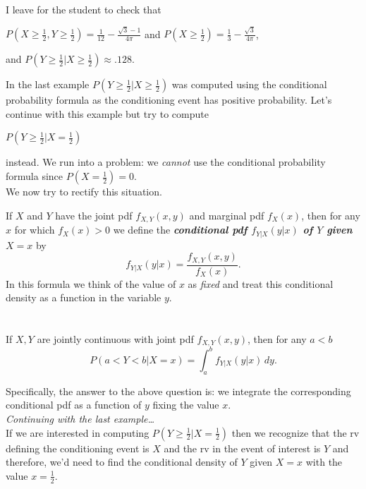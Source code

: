 \documentclass[12pt]{article}
\begin{document}
\noindent I leave for the student to check that
\begin{center}$P(X\ge \frac 12,Y\ge \frac 12) = \frac 1{12} - \frac {\sqrt{3}-1}{4\pi}$ and $P(X\ge \frac 12)=\frac 13-\frac {\sqrt{3}}{4\pi}$,\end{center}
and $P(Y\ge \frac 12|X\ge \frac 12) \approx .128$.\\

\newpage

\noindent In the last example $P(Y\ge \frac 12|X\ge \frac 12)$ was computed using the conditional probability formula as the conditioning event has positive probability.
Let's continue with this example but try to compute
\begin{center}$P(Y\ge \frac 12|X=\frac 12)$\end{center}
instead.  We run into a problem: we {\em cannot} use the conditional probability formula since $P(X=\frac 12)=0$.\\

\noindent We now try to rectify this situation.\\

\label{conditionalpdf}

If $X$ and $Y$ have the joint pdf $f_{X,Y}(x,y)$ and marginal pdf $f_X(x)$, then for any $x$ for which $f_X(x) >0$ we define
the {\bf\em conditional pdf $f_{Y|X}(y|x)$ of $Y$ given $X=x$} by
$$f_{Y|X}(y|x) = \frac {f_{X,Y}(x,y)}{f_X(x)}.$$
In this formula we think of the value of $x$ as {\em fixed} and treat this conditional density as a function in the variable $y$.\\

\\

 \\
If $X,Y$ are jointly continuous with joint pdf $f_{X,Y}(x,y)$, then for any $a<b$
$$P(a< Y< b|X=x) = \int_a^b f_{Y|X}(y|x)\,dy.$$

\bigskip

\noindent Specifically, the answer to the above question is: we integrate the corresponding conditional pdf as a function of $y$ fixing the value $x$.\\

 {\em Continuing with the last example\dots}\\
If we are interested in computing $P(Y\ge \frac 12|X=\frac 12)$ then we recognize that the rv defining the conditioning event is $X$ and the rv in the event of interest is $Y$ and
therefore, we'd need to find the conditional density of $Y$ given $X=x$ with the value $x=\frac 12$.
\end{document}
